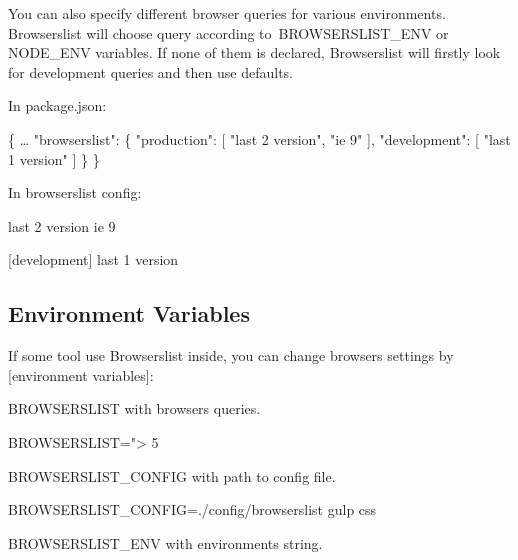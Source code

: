 You can also specify different browser queries for various environments. Browserslist will choose query according to {\ttfamily B\+R\+O\+W\+S\+E\+R\+S\+L\+I\+S\+T\+\_\+\+E\+NV} or {\ttfamily N\+O\+D\+E\+\_\+\+E\+NV} variables. If none of them is declared, Browserslist will firstly look for {\ttfamily development} queries and then use defaults.

In {\ttfamily package.\+json}\+:


\begin{DoxyCode}
\{
  …
  "browserslist": \{
    "production": [
      "last 2 version",
      "ie 9"
    ],
    "development": [
      "last 1 version"
    ]
  \}
\}
\end{DoxyCode}


In {\ttfamily browserslist} config\+:


\begin{DoxyCode}
[production]
last 2 version
ie 9

[development]
last 1 version
\end{DoxyCode}


\subsection*{Environment Variables}

If some tool use Browserslist inside, you can change browsers settings by \mbox{[}environment variables\mbox{]}\+:


\begin{DoxyItemize}
\item {\ttfamily B\+R\+O\+W\+S\+E\+R\+S\+L\+I\+ST} with browsers queries.
\end{DoxyItemize}


\begin{DoxyCode}
BROWSERSLIST="> 5%
\end{DoxyCode}



\begin{DoxyItemize}
\item {\ttfamily B\+R\+O\+W\+S\+E\+R\+S\+L\+I\+S\+T\+\_\+\+C\+O\+N\+F\+IG} with path to config file.
\end{DoxyItemize}


\begin{DoxyCode}
BROWSERSLIST\_CONFIG=./config/browserslist gulp css
\end{DoxyCode}



\begin{DoxyItemize}
\item {\ttfamily B\+R\+O\+W\+S\+E\+R\+S\+L\+I\+S\+T\+\_\+\+E\+NV} with environments string.
\end{DoxyItemize}


